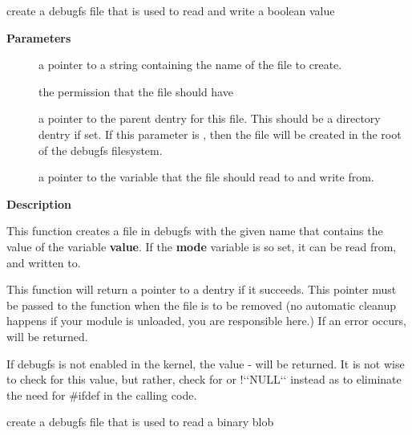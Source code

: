 \documentclass[a4paper,8pt,english]{sphinxmanual}
\begin{document}
\begin{fulllineitems}
\label{filesystems/index:c.debugfs_create_bool}
create a debugfs file that is used to read and write a boolean value

\end{fulllineitems}


\textbf{Parameters}
\begin{description}
\item[{}] \leavevmode
a pointer to a string containing the name of the file to create.

\item[{}] \leavevmode
the permission that the file should have

\item[{}] \leavevmode
a pointer to the parent dentry for this file.  This should be a
directory dentry if set.  If this parameter is , then the
file will be created in the root of the debugfs filesystem.

\item[{}] \leavevmode
a pointer to the variable that the file should read to and write
from.

\end{description}

\textbf{Description}

This function creates a file in debugfs with the given name that
contains the value of the variable \textbf{value}.  If the \textbf{mode} variable is so
set, it can be read from, and written to.

This function will return a pointer to a dentry if it succeeds.  This
pointer must be passed to the {\hyperref[filesystems/index:c.debugfs_remove]{\emph{}}} function when the file is
to be removed (no automatic cleanup happens if your module is unloaded,
you are responsible here.)  If an error occurs,  will be returned.

If debugfs is not enabled in the kernel, the value - will be
returned.  It is not wise to check for this value, but rather, check for
 or !{}`{}`NULL{}`{}` instead as to eliminate the need for \#ifdef in the calling
code.

\begin{fulllineitems}
\label{filesystems/index:c.debugfs_create_blob}
create a debugfs file that is used to read a binary blob

\end{fulllineitems}
\end{document}
